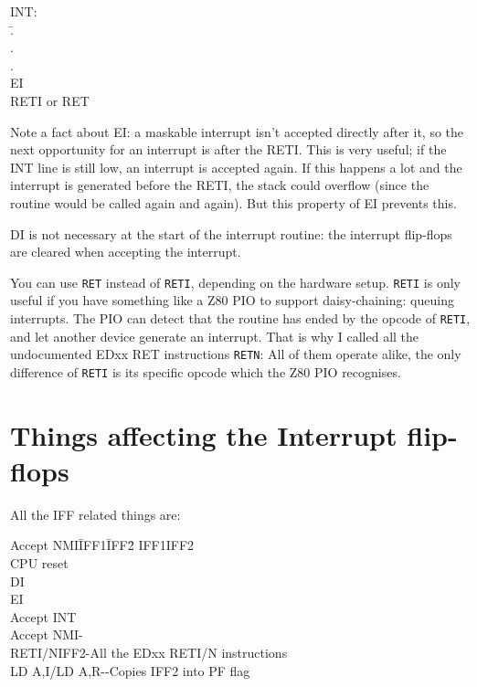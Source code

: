 \documentclass[oneside,a4paper]{book}
\begin{document}
{\ttfamily
\begin{tabbing}
INT:\\
{\qquad}\=.\\
\>.\\
\>.\\
\>EI\\
\>RETI {\rmfamily or} RET
\end{tabbing}
}

Note a fact about {\ttfamily EI}: a maskable interrupt isn't accepted directly 
after it, so the next opportunity for an interrupt is after the 
{\ttfamily RETI}. This is very useful; if the INT line is still low, an 
interrupt is accepted again.  If this happens a lot and the interrupt is 
generated before the {\ttfamily RETI}, the stack could overflow (since the 
routine would be called again and again). But this property of {\ttfamily EI} 
prevents this.

{\ttfamily DI} is not necessary at the start of the interrupt routine: the
interrupt flip-flops are cleared when accepting the interrupt.

You can use {\tt RET} instead of {\tt RETI}, depending on the hardware setup. 
{\tt RETI} is only useful if you have something like a Z80 PIO to support 
daisy-chaining: queuing interrupts. The PIO can detect that the routine has 
ended by the opcode of {\tt RETI}, and let another device generate an 
interrupt. That is why I called all the undocumented EDxx RET instructions 
{\tt RETN}: All of them operate alike, the only difference of {\tt RETI} is 
its specific opcode which the Z80 PIO recognises.

\section{Things affecting the Interrupt flip-flops}
\label{flipflop}

All the IFF related things are:

\begin{tabbing}
Accept NMI{\qquad}\=IFF1{\qquad}\=IFF2{\qquad}\= \kill
\>IFF1\>IFF2\>\\
CPU reset\\
{\ttfamily DI}\\
{\ttfamily EI}\\
Accept INT\\
Accept NMI\>-\\
{\ttfamily RETI/N}\>IFF2\>-\>All the EDxx RETI/N instructions\\
{\ttfamily LD A,I/LD A,R}\>-\>-\>Copies IFF2 into PF flag
\end{tabbing}
\end{document}
